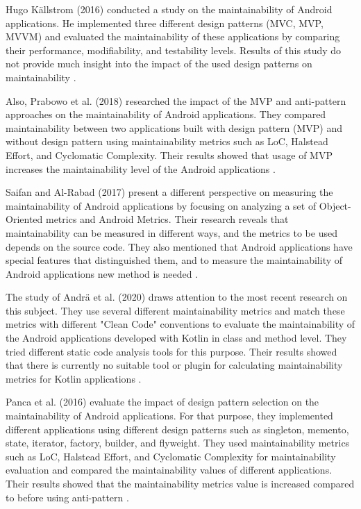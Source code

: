 Hugo Källstrom (2016) conducted a study on the maintainability of Android applications. He implemented three different design patterns (MVC, MVP, MVVM) and evaluated the maintainability of these applications by comparing their performance, modifiability, and testability levels. Results of this study do not provide much insight into the impact of the used design patterns on maintainability \cite{18}. 

Also, Prabowo et al. (2018) researched the impact of the MVP and anti-pattern approaches on the maintainability of Android applications. They compared maintainability between two applications built with design pattern (MVP) and without design pattern using maintainability metrics such as LoC, Halstead Effort, and Cyclomatic Complexity. Their results showed that usage of MVP increases the maintainability level of the Android applications \cite{19}. 

Saifan and Al-Rabad (2017) present a different perspective on measuring the maintainability of Android applications by focusing on analyzing a set of Object-Oriented metrics and Android Metrics. Their research reveals that maintainability can be measured in different ways, and the metrics to be used depends on the source code.  They also mentioned that Android applications have special features that distinguished them, and to measure the maintainability of Android applications new method is needed \cite{34}. 

The study of Andrä et al. (2020) draws attention to the most recent research on this subject. They use several different maintainability metrics and match these metrics with different "Clean Code" conventions to evaluate the maintainability of the Android applications developed with Kotlin in class and method level. They tried different static code analysis tools for this purpose. Their results showed that there is currently no suitable tool or plugin for calculating maintainability metrics for Kotlin applications \cite{43}. 

Panca et al. (2016) evaluate the impact of design pattern selection on the maintainability of Android applications. For that purpose, they implemented different applications using different design patterns such as singleton, memento, state, iterator, factory, builder, and flyweight. They used maintainability metrics such as LoC, Halstead Effort, and Cyclomatic Complexity for maintainability evaluation and compared the maintainability values of different applications. Their results showed that the maintainability metrics value is increased compared to before using anti-pattern \cite{52}. 

